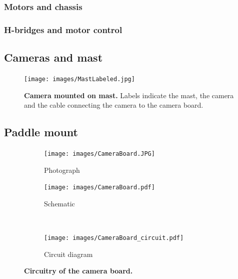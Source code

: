 \documentclass[letterpaper, 11pt]{article}
\begin{document}
\begin{enumerate}[label=\textbf{\arabic*.}]
\subsubsection{Motors and chassis}
\subsubsection{H-bridges and motor control}

\subsection{Cameras and mast}

\begin{figure}[ht]
    \centering
    \texttt{[image: images/MastLabeled.jpg]}
    \caption{\textbf{Camera mounted on mast.} Labels indicate the mast, the camera and the cable connecting the camera to the camera board.}
    \label{fig:mast}
\end{figure}


\subsection{Paddle mount}

\begin{figure}[ht]
    \centering
    \begin{subfigure}[b]{0.45\textwidth}
        \centering
        \texttt{[image: images/CameraBoard.JPG]}
        \caption{Photograph}
    \end{subfigure}%
    \begin{subfigure}[b]{0.55\textwidth}
        \centering
        \texttt{[image: images/CameraBoard.pdf]}
        \caption{Schematic}
    \end{subfigure} \\ \vspace{1cm}
    \begin{subfigure}[b]{0.99\textwidth}
        \centering
        \texttt{[image: images/CameraBoard\_circuit.pdf]}
        \caption{Circuit diagram}
    \end{subfigure}
    \caption{\textbf{Circuitry of the camera board.}}
    \label{fig:cameraboard}
\end{figure}


\end{enumerate}
\end{document}
